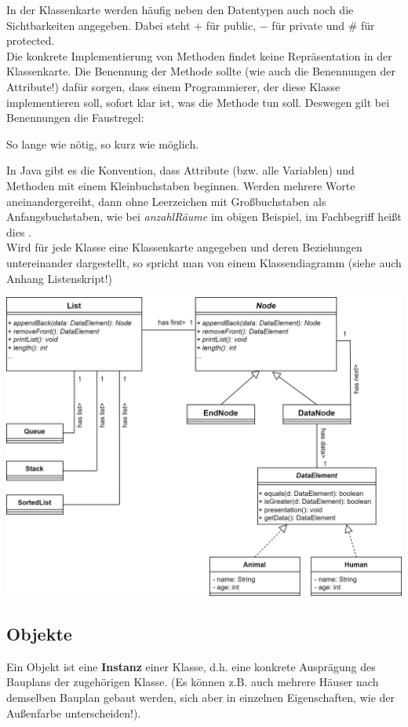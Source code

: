 \documentclass{article}
\begin{document}
In der Klassenkarte werden häufig neben den Datentypen auch noch die Sichtbarkeiten angegeben. Dabei steht $+$ für public, $-$ für private und $\#$ für protected. \\
Die konkrete Implementierung von Methoden findet keine Repräsentation in der Klassenkarte. Die Benennung der Methode sollte (wie auch die Benennungen der Attribute!) dafür sorgen, dass einem Programmierer, der diese Klasse implementieren soll, sofort klar ist, was die Methode tun soll. Deswegen gilt bei Benennungen die Faustregel:
\begin{center}
    So lange wie nötig, so kurz wie möglich. 
\end{center}
In Java gibt es die Konvention, dass Attribute (bzw. alle Variablen) und Methoden mit einem Kleinbuchstaben beginnen. Werden mehrere Worte aneinandergereiht, dann ohne Leerzeichen mit Großbuchstaben als Anfangsbuchstaben, wie bei \textit{anzahlRäume} im obigen Beispiel, im Fachbegriff heißt dies . \\
Wird für jede Klasse eine Klassenkarte angegeben und deren Beziehungen untereinander dargestellt, so spricht man von einem Klassendiagramm (siehe auch Anhang Listenskript!) 
\newpage
{} \\
\begin{center}
    \includegraphics[scale=0.2]{media/adapter_lists.png}
\end{center}

\subsection{Objekte}
Ein Objekt ist eine \textbf{Instanz} einer Klasse, d.h. eine konkrete Ausprägung des Bauplans der zugehörigen Klasse. (Es können z.B. auch mehrere Häuser nach demselben Bauplan gebaut werden, sich aber in einzelnen Eigenschaften, wie der Außenfarbe unterscheiden!). \\
\end{document}
